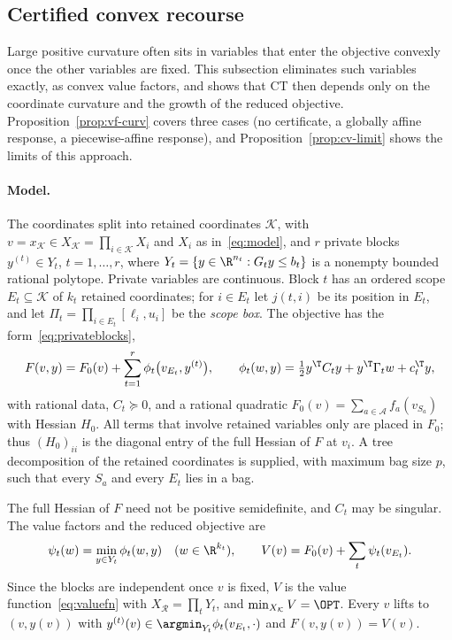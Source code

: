 \subsection{Certified convex recourse}\label{sec:convexrecourse}

Large positive curvature often sits in variables that enter the objective
convexly once the other variables are fixed. This subsection eliminates such
variables exactly, as convex value factors, and shows that CT then depends
only on the coordinate curvature and the growth of the reduced objective.
Proposition~\ref{prop:vf-curv} covers three cases (no certificate, a
globally affine response, a piecewise-affine response), and
Proposition~\ref{prop:cv-limit} shows the limits of this approach.

\paragraph{Model.}

\begin{definition}\label{def:cv-model}
The coordinates split into retained coordinates $\mathcal K$, with
$v=x_{\mathcal K}\in X_{\mathcal K}=\prod_{i\in\mathcal K}X_i$ and $X_i$ as
in~\eqref{eq:model}, and $r$ private blocks $y^{(t)}\in Y_t$,
$t=1,\ldots,r$, where $Y_t=\{y\in\R^{n_t}:G_ty\le b_t\}$ is a nonempty
bounded rational polytope. Private variables are continuous. Block $t$ has
an ordered scope $E_t\subseteq\mathcal K$ of $k_t$ retained coordinates; for
$i\in E_t$ let $j(t,i)$ be its position in $E_t$, and let
$\Pi_t=\prod_{i\in E_t}[\ell_i,u_i]$ be the \emph{scope box}. The objective
has the form~\eqref{eq:privateblocks},
\begin{equation}\label{eq:cv-model}
F(v,y)=F_0(v)+\sum_{t=1}^r\phi_t\bigl(v_{E_t},y^{(t)}\bigr),\qquad
\phi_t(w,y)=\tfrac12y^{\T}C_ty+y^{\T}\Gamma_tw+c_t^{\T}y,
\end{equation}
with rational data, $C_t\succeq0$, and a rational quadratic
$F_0(v)=\sum_{a\in\mathcal A}f_a(v_{S_a})$ with Hessian $H_0$. All terms
that involve retained variables only are placed in $F_0$; thus $(H_0)_{ii}$
is the diagonal entry of the full Hessian of $F$ at $v_i$. A tree
decomposition of the retained coordinates is supplied, with maximum bag size
$p$, such that every $S_a$ and every $E_t$ lies in a bag.
\end{definition}

The full Hessian of $F$ need not be positive semidefinite, and $C_t$ may be
singular. The value factors and the reduced objective are
\begin{equation}\label{eq:cv-value}
\psi_t(w)=\min_{y\in Y_t}\phi_t(w,y)\quad(w\in\R^{k_t}),\qquad
V(v)=F_0(v)+\sum_t\psi_t(v_{E_t}).
\end{equation}
Since the blocks are independent once $v$ is fixed, $V$ is the value
function~\eqref{eq:valuefn} with $X_{\mathcal R}=\prod_tY_t$, and
$\min_{X_{\mathcal K}}V=\OPT$. Every $v$ lifts to $(v,y(v))$ with
$y^{(t)}(v)\in\argmin_{Y_t}\phi_t(v_{E_t},\cdot)$ and $F(v,y(v))=V(v)$.

